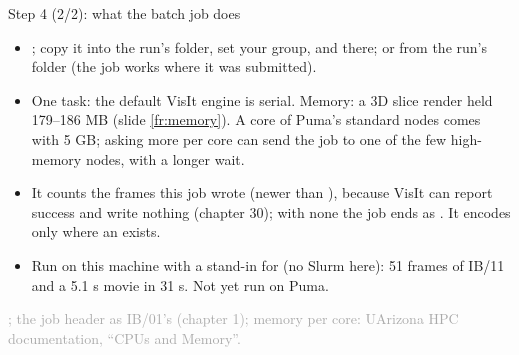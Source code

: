 \documentclass[aspectratio=169,11pt]{beamer}
\newcommand{\sourcecredit}[1]{\vfill\begin{flushright}\tiny\textcolor{DarkGray}{#1}\end{flushright}}
\begin{document}
\begin{frame}{Step 4 (2/2): what the batch job does}
\label{fr:batch2}
\footnotesize
\begin{itemize}\setlength{\itemsep}{1pt}
  \item {}\allowbreak{}; copy it into the run's folder, set your group, and  there; or  from the run's folder (the job works where it was submitted).
  \item One task: the default VisIt engine is serial. Memory: a 3D slice render held 179--186 MB (slide \ref{fr:memory}). A core of Puma's standard nodes comes with 5 GB; asking more per core can send the job to one of the few high-memory nodes, with a longer wait.
  \item It counts the frames this job wrote (newer than ), because VisIt can report success and write nothing (chapter 30); with none the job ends as . It encodes only where an  exists.
  \item Run on this machine with a stand-in for  (no Slurm here): 51 frames of IB/11 and a 5.1 s movie in 31 s. Not yet run on Puma.
\end{itemize}
\sourcecredit{; the job header as IB/01's \code{job.slurm} (chapter 1); memory per core: UArizona HPC documentation, ``CPUs and Memory''.}
\end{frame}
\end{document}
